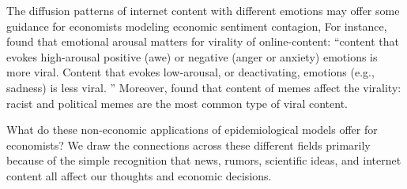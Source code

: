 	The diffusion patterns of internet content with different emotions may offer some guidance for economists modeling economic sentiment contagion, For instance, \href{https://journals.sagepub.com/doi/10.1509/jmr.10.0353}{\cite{berger2012makes}} found that emotional arousal matters for virality of online-content: ``content that evokes high-arousal positive (awe) or negative (anger or anxiety) emotions is more viral. Content that evokes low-arousal, or deactivating, emotions (e.g., sadness) is less viral. '' Moreover,  \href{https://arxiv.org/abs/1805.12512}{\cite{zannettou2018origins}} found that content of memes affect the virality: racist and political memes are the most common type of viral content.


	What do these non-economic applications of epidemiological models offer for economists?  We draw the connections across these different fields primarily because of the simple recognition that news, rumors, scientific ideas, and internet content all affect our thoughts and economic decisions.

